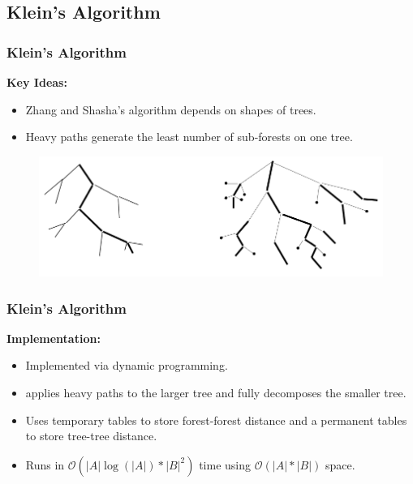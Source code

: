 \documentclass{beamer}
\begin{document}
\subsection{Klein's Algorithm}
\begin{frame}
\frametitle{Klein's Algorithm}
\textbf{Key Ideas:}
\begin{itemize}
\item Zhang and Shasha's algorithm depends on shapes of trees.
\item Heavy paths generate the least number of sub-forests on one tree.
\end{itemize}
\begin{figure}
	\includegraphics[width=0.8\linewidth]{HeavyPaths}
	\centering
\end{figure}
\end{frame}
\begin{frame}
\frametitle{Klein's Algorithm}
\textbf{Implementation:}
\begin{itemize}
\item Implemented via dynamic programming.
\item applies heavy paths to the larger tree and fully decomposes the smaller tree.
\item Uses temporary tables to store forest-forest distance and a permanent tables to store tree-tree distance.
\item Runs in $\mathcal{O}(\left\vert A \right\vert \log(\left\vert A \right\vert) * \left\vert B \right\vert^2)$ time using $\mathcal{O}(\left\vert A \right\vert * \left\vert B \right\vert)$ space.
\end{itemize}
\end{frame}
\end{document}
